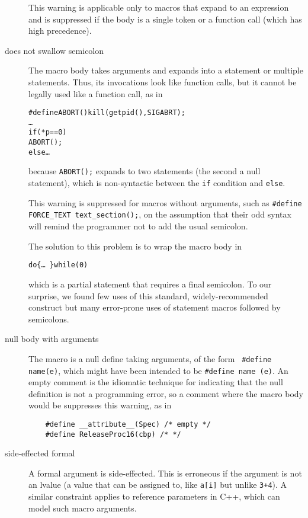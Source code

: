 \documentclass[10pt]{article}
\begin{document}
\begin{description}
        This warning is applicable only to macros that expand to an
        expression and is suppressed if the body is a single token or a
        function call (which has high precedence).

\item[does not swallow semicolon]\label{item:swallow-semicolon}
        The macro body takes arguments and expands into a statement or
        multiple statements.  Thus, its invocations look like function
        calls, but it cannot be legally used like a function call, as in
\begin{alltt}
    #define ABORT() kill(getpid(),SIGABRT);
    \ldots
    if (*p == 0)
      ABORT();
    else \ldots
\end{alltt}
        because {\tt ABORT();} expands to two statements (the second a null
        statement), which is non-syntactic between the {\tt if} condition and
        {\tt else}.
        
        This warning is suppressed for macros without arguments, such as
        {\tt \#define \verb|FORCE_TEXT| \verb|text_section|();}, on the
        assumption that their odd syntax will remind the programmer not to
        add the usual semicolon.

        The solution to this problem is to wrap the macro body in
\begin{alltt}
             do \verb|{| \ldots\ \verb|}| while (0)
\end{alltt}
        which is a partial statement that requires a final semicolon.  To
        our surprise, we found few uses of this standard, widely-recommended
        construct but many error-prone uses of statement macros followed by
        semicolons.

\item[null body with arguments]
        The macro is a null define taking arguments, of the form {\tt
        \#define name(e)},
        which might have been intended to be {\tt \#define name (e)}.
        An empty comment is the idiomatic technique for indicating that the
        null definition is not a programming error, so a comment where the macro
        body would be suppresses this warning, as in
\begin{verbatim}
    #define __attribute__(Spec) /* empty */
    #define ReleaseProc16(cbp) /* */
\end{verbatim}

\item[side-effected formal]
        A formal argument is side-effected.  This is erroneous if the
        argument is not an lvalue (a value that can be assigned to, like
        {\tt a[i]} but unlike {\tt 3+4}).  A similar constraint applies to
        reference parameters in C++, which can model such macro arguments.


\end{description}
\end{document}
